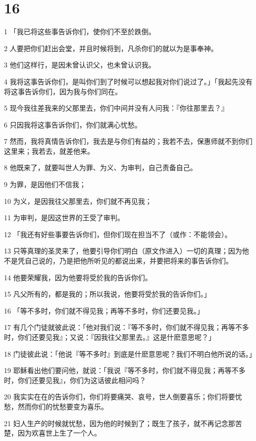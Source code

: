 \chapter{16}

\par 1 「我已将这些事告诉你们，使你们不至於跌倒。
\par 2 人要把你们赶出会堂，并且时候将到，凡杀你们的就以为是事奉神。
\par 3 他们这样行，是因未曾认识父，也未曾认识我。
\par 4 我将这事告诉你们，是叫你们到了时候可以想起我对你们说过了。」「我起先没有将这事告诉你们，因为我与你们同在。
\par 5 现今我往差我来的父那里去，你们中间并没有人问我：『你往那里去？』
\par 6 只因我将这事告诉你们，你们就满心忧愁。
\par 7 然而，我将真情告诉你们，我去是与你们有益的；我若不去，保惠师就不到你们这里来；我若去，就差他来。
\par 8 他既来了，就要叫世人为罪、为义、为审判，自己责备自己。
\par 9 为罪，是因他们不信我；
\par 10 为义，是因我往父那里去，你们就不再见我；
\par 11 为审判，是因这世界的王受了审判。
\par 12 「我还有好些事要告诉你们，但你们现在担当不了（或作：不能领会）。
\par 13 只等真理的圣灵来了，他要引导你们明白（原文作进入）一切的真理；因为他不是凭自己说的，乃是把他所听见的都说出来，并要把将来的事告诉你们。
\par 14 他要荣耀我，因为他要将受於我的告诉你们。
\par 15 凡父所有的，都是我的；所以我说，他要将受於我的告诉你们。」
\par 16 「等不多时，你们就不得见我；再等不多时，你们还要见我。」
\par 17 有几个门徒就彼此说：「他对我们说：『等不多时，你们就不得见我；再等不多时，你们还要见我』；又说：『因我往父那里去。』这是什麽意思呢？」
\par 18 门徒彼此说：「他说『等不多时』到底是什麽意思呢？我们不明白他所说的话。」
\par 19 耶稣看出他们要问他，就说：「我说『等不多时，你们就不得见我；再等不多时，你们还要见我』，你们为这话彼此相问吗？
\par 20 我实实在在的告诉你们，你们将要痛哭、哀号，世人倒要喜乐；你们将要忧愁，然而你们的忧愁要变为喜乐。
\par 21 妇人生产的时候就忧愁，因为他的时候到了；既生了孩子，就不再记念那苦楚，因为欢喜世上生了一个人。
